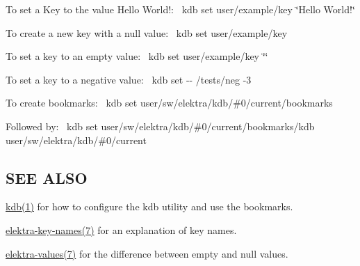 To set a Key to the value {\ttfamily Hello World!}\+:~\newline
 {\ttfamily kdb set user/example/key \char`\"{}\+Hello World!\char`\"{}}

To create a new key with a null value\+:~\newline
 {\ttfamily kdb set user/example/key}

To set a key to an empty value\+:~\newline
 {\ttfamily kdb set user/example/key \char`\"{}\char`\"{}}

To set a key to a negative value\+:~\newline
 {\ttfamily kdb set -\/-\/ /tests/neg -\/3}

To create bookmarks\+:~\newline
 {\ttfamily kdb set user/sw/elektra/kdb/\#0/current/bookmarks}

Followed by\+:~\newline
 {\ttfamily kdb set user/sw/elektra/kdb/\#0/current/bookmarks/kdb user/sw/elektra/kdb/\#0/current}

\subsection*{S\+EE A\+L\+SO}


\begin{DoxyItemize}
\item \hyperlink{doc_help_kdb_md}{kdb(1)} for how to configure the kdb utility and use the bookmarks.
\item \hyperlink{doc_help_elektra-key-names_md}{elektra-\/key-\/names(7)} for an explanation of key names.
\item \hyperlink{doc_help_elektra-values_md}{elektra-\/values(7)} for the difference between empty and null values. 
\end{DoxyItemize}